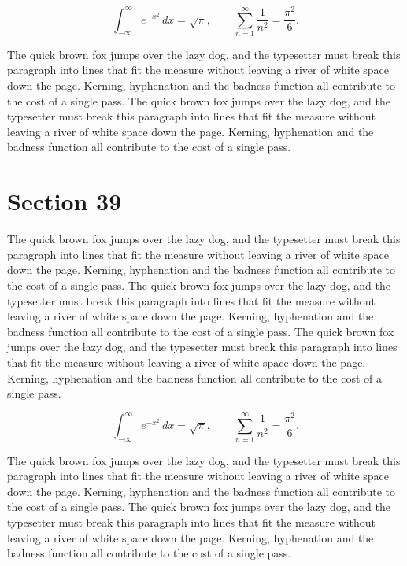 \documentclass{article}
\begin{document}
\begin{equation}
\int_{-\infty}^{\infty} e^{-x^{2}}\,dx = \sqrt{\pi}, \qquad
\sum_{n=1}^{\infty} \frac{1}{n^{2}} = \frac{\pi^{2}}{6}.
\end{equation}

The quick brown fox jumps over the lazy dog, and the typesetter must break this paragraph into lines that fit the measure without leaving a river of white space down the page. Kerning, hyphenation and the badness function all contribute to the cost of a single pass. The quick brown fox jumps over the lazy dog, and the typesetter must break this paragraph into lines that fit the measure without leaving a river of white space down the page. Kerning, hyphenation and the badness function all contribute to the cost of a single pass. 
\section{Section 39}
The quick brown fox jumps over the lazy dog, and the typesetter must break this paragraph into lines that fit the measure without leaving a river of white space down the page. Kerning, hyphenation and the badness function all contribute to the cost of a single pass. The quick brown fox jumps over the lazy dog, and the typesetter must break this paragraph into lines that fit the measure without leaving a river of white space down the page. Kerning, hyphenation and the badness function all contribute to the cost of a single pass. The quick brown fox jumps over the lazy dog, and the typesetter must break this paragraph into lines that fit the measure without leaving a river of white space down the page. Kerning, hyphenation and the badness function all contribute to the cost of a single pass. 

\begin{equation}
\int_{-\infty}^{\infty} e^{-x^{2}}\,dx = \sqrt{\pi}, \qquad
\sum_{n=1}^{\infty} \frac{1}{n^{2}} = \frac{\pi^{2}}{6}.
\end{equation}

The quick brown fox jumps over the lazy dog, and the typesetter must break this paragraph into lines that fit the measure without leaving a river of white space down the page. Kerning, hyphenation and the badness function all contribute to the cost of a single pass. The quick brown fox jumps over the lazy dog, and the typesetter must break this paragraph into lines that fit the measure without leaving a river of white space down the page. Kerning, hyphenation and the badness function all contribute to the cost of a single pass. 
\end{document}

